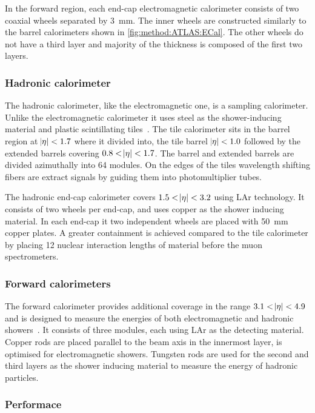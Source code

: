 In the forward region, each end-cap electromagnetic calorimeter consists of two coaxial wheels separated by \SI{3}{mm}. The inner wheels are constructed similarly to the barrel calorimeters shown in \cref{fig:method:ATLAS:ECal}. The other wheels do not have a third layer and majority of the thickness is composed of the first two layers. 

\subsubsection{Hadronic calorimeter}
The hadronic calorimeter, like the electromagnetic one, is a sampling calorimeter. Unlike the electromagnetic calorimeter it uses steel as the shower-inducing material and plastic scintillating tiles~\cite{ATLAS:tile-TDR}. The tile calorimeter sits in the barrel region at $\abs{\eta} < 1.7$ where it divided into, the tile barrel $\abs{\eta} < 1.0$ followed by the extended barrels covering $ 0.8 < \abs{\eta} < 1.7 $. The barrel and extended barrels are divided azimuthally into 64 modules. On the edges of the tiles wavelength shifting fibers are extract signals by guiding them into photomultiplier tubes. 

The hadronic end-cap calorimeter covers  $1.5 < \abs{\eta} < 3.2$ using LAr technology. It consists of two wheels per end-cap, and uses copper as the shower inducing material. In each end-cap it two independent wheels are placed with \SI{50}{\milli\meter} copper plates. A greater containment is achieved compared to the tile calorimeter by placing 12 nuclear interaction lengths of material before the muon spectrometers. 

\subsubsection{Forward calorimeters}
The forward calorimeter provides additional coverage in the range $3.1 < \abs{\eta} < 4.9$ and is designed to measure the energies of both electromagnetic and hadronic showers~\cite{ATLAS:LAr-TDR}. It consists of three modules, each using LAr as the detecting material. Copper rods are placed parallel to the beam axis in the innermost layer, is optimised for electromagnetic showers. Tungsten rods are used for the second and third layers as the shower inducing material to measure the energy of hadronic particles. 

\subsubsection{Performace}

